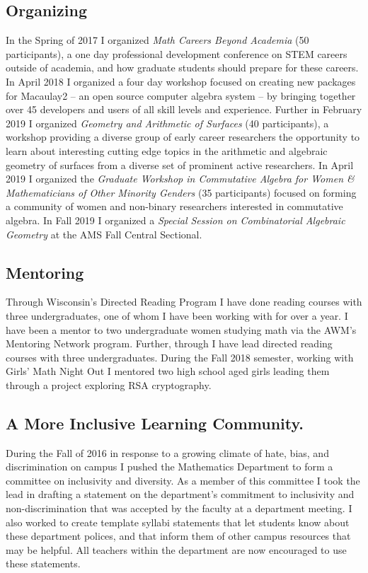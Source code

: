 \documentclass[10pt,reqno]{amsart}
\theoremstyle{remark}
\begin{document}
\subsection{Organizing}
In the Spring of 2017 I organized \textit{Math Careers Beyond Academia } (50 participants), a one day professional development conference on STEM careers outside of academia, and how graduate students should prepare for these careers. In April 2018 I organized a four day workshop focused on creating new packages for Macaulay2 -- an open source computer algebra system -- by bringing together over 45 developers and users of all skill levels and experience. Further in February 2019 I organized \textit{Geometry and Arithmetic of Surfaces} (40 participants), a workshop providing a diverse group of early career researchers the opportunity to learn about interesting cutting edge topics in the arithmetic and algebraic geometry of surfaces from a diverse set of prominent active researchers. In April 2019 I organized the \textit{Graduate Workshop in Commutative Algebra for Women \& Mathematicians of Other Minority Genders} (35 participants)  focused on forming a community of women and non-binary researchers interested in commutative algebra. In Fall 2019 I organized a \textit{Special Session on Combinatorial Algebraic Geometry} at the AMS Fall Central Sectional. 

\subsection{Mentoring}
Through Wisconsin's Directed Reading Program I have done reading courses with three undergraduates, one of whom I have been working with for over a year. I have been a mentor to two undergraduate women studying math via the AWM's Mentoring Network program. Further, through I have lead directed reading courses with three undergraduates. During the Fall 2018 semester, working with Girls' Math Night Out I mentored two high school aged girls leading them through a project exploring RSA cryptography.  


\subsection{A More Inclusive Learning Community.} During the Fall of 2016 in response to a growing climate of hate, bias, and discrimination on campus I pushed the Mathematics Department to form a committee on inclusivity and diversity. As a member of this committee I took the lead in drafting a statement on the department's commitment to inclusivity and non-discrimination that was  accepted by the faculty at a department meeting. I also worked to create template syllabi statements that let students know about these department polices, and that inform them of other campus resources that may be helpful. All teachers within the department are now encouraged to use these statements. 
\end{document}
